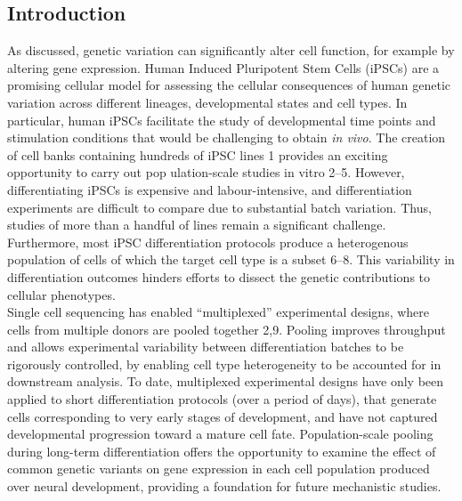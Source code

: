 \subsection{Introduction}

As discussed, genetic variation can significantly alter cell function, for example by altering gene expression. 
Human Induced Pluripotent Stem Cells (iPSCs) are a promising cellular model for
assessing the cellular consequences of human genetic variation across different lineages, developmental states and cell types. 
In particular, human iPSCs facilitate the study of developmental time points and stimulation conditions that would be challenging to obtain \textit{in vivo}. 
The creation of cell banks containing hundreds of iPSC lines 1 provides an exciting opportunity to carry out pop ulation-scale studies in vitro 2–5.
However, differentiating iPSCs is expensive and labour-intensive, and differentiation experiments are difficult to compare due to substantial batch variation. 
Thus, studies of more than a handful of lines remain a significant challenge.
Furthermore, most iPSC differentiation protocols produce a heterogenous population of cells of which the target cell type is a subset 6–8. 
This variability in differentiation outcomes hinders efforts to dissect the genetic contributions to cellular phenotypes.\\

Single cell sequencing has enabled “multiplexed” experimental designs, where cells from multiple donors are pooled together 2,9. 
Pooling improves throughput and allows experimental variability between differentiation batches to be rigorously controlled, by enabling cell type heterogeneity to be accounted for in downstream analysis. 
To date, multiplexed experimental designs have only been applied to short differentiation protocols (over a period of days), that generate cells corresponding to very early stages of development, and have not captured developmental progression toward a mature cell fate. 
Population-scale pooling during long-term differentiation offers the opportunity to examine the effect of common genetic variants on gene expression in each cell population produced over neural development, providing a foundation for future mechanistic studies.

